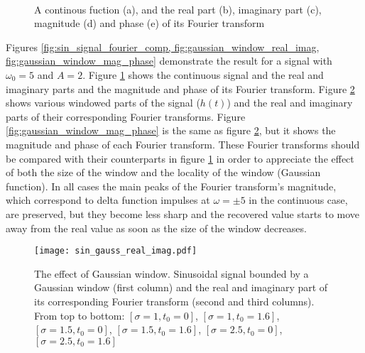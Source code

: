 \begin{figure}
\centering
{}%
\\%
\hspace{0.33\textwidth}
\caption{A continous fuction (a), and the real part (b), imaginary part (c), magnitude (d) and phase (e) of its Fourier transform}\label{fig:sin_signal_fourier_comp}
\end{figure}

Figures \ref{fig:sin_signal_fourier_comp, fig:gaussian_window_real_imag, fig:gaussian_window_mag_phase} demonstrate the result for a signal with $\omega_0=5$ and $A=2$. Figure \ref{fig:sin_signal_fourier_comp} shows the continuous signal and  the real and imaginary parts and the magnitude and phase of its Fourier transform.  Figure \ref{fig:gaussian_window_real_imag} shows various windowed parts of the signal ($h(t)$) and the real and imaginary parts of their corresponding Fourier transforms.  Figure \ref{fig:gaussian_window_mag_phase} is the same as figure \ref{fig:gaussian_window_real_imag}, but it shows the magnitude and phase of each Fourier transform. These Fourier transforms should be compared with their counterparts in figure \ref{fig:sin_signal_fourier_comp} in order to appreciate the effect of both the size of the window and the locality of the window (Gaussian function). In all cases the main peaks of the Fourier transform's magnitude, which correspond to delta function impulses at $\omega=\pm 5$ in the continuous case, are preserved, but they become less sharp and the recovered value starts to move away from the real value as soon as the size of the window decreases. 



\begin{figure}
\centering
\texttt{[image: sin\_gauss\_real\_imag.pdf]}
\caption{The effect of Gaussian window. Sinusoidal signal bounded by a Gaussian window (first column) and the real and imaginary part of its corresponding Fourier transform (second and third columns). From top to bottom: $[\sigma=1, t_0=0]$, $[\sigma=1, t_0=1.6]$, $[\sigma=1.5, t_0=0]$, $[\sigma=1.5, t_0=1.6]$, $[\sigma=2.5, t_0=0]$, $[\sigma=2.5, t_0=1.6]$}\label{fig:gaussian_window_real_imag}
\end{figure}

